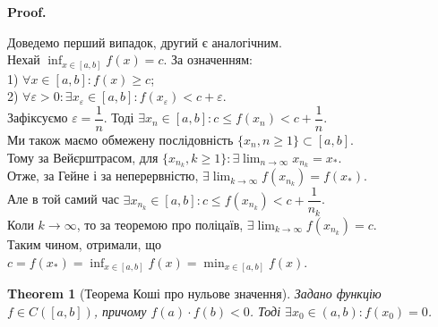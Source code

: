 \documentclass[a4paper, 14pt]{article}
\makeatletter
\def\huge{\displaystyle}
\def\qed{$\blacksquare$}
\theoremstyle{theoremdd}
\newtheorem{theorem}{Theorem}[subsection]
\theoremstyle{theoremdd}
\theoremstyle{theoremdd}
\theoremstyle{theoremdd}
\theoremstyle{theoremdd}
\theoremstyle{theoremdd}
\theoremstyle{theoremdd}
\theoremstyle{theoremdd}
\renewenvironment{proof}[1][Proof.\\]{\par
\pushQED{\hfill \qed}%
\normalfont \topsep6\p@\@plus6\p@\relax
\trivlist
\item\relax
{\bfseries
#1\@addpunct{.}}\hspace\labelsep\ignorespaces
}{%
\popQED\endtrivlist\@endpefalse
}
\makeatother
\begin{document}
\begin{proof}
Доведемо перший випадок, другий є аналогічним.\\
Нехай $\huge \inf_{x \in [a,b]} f(x) = c$. За означенням:\\
1) $\forall x \in [a,b]: f(x) \geq c$;\\
2) $\forall \varepsilon > 0: \exists x_{\varepsilon} \in [a,b]: f(x_{\varepsilon}) < c + \varepsilon$.\\
Зафіксуємо $\varepsilon = \dfrac{1}{n}$. Тоді $\exists x_n \in [a,b]: c \leq f(x_n) < c + \dfrac{1}{n}$.\\
Ми також маємо обмежену послідовність $\{x_n, n \geq 1\} \subset [a,b]$.\\
Тому за Вейєрштрасом, для $\{x_{n_k},k \geq 1\}: \exists \huge \lim_{n \to \infty} x_{n_k} = x_*$.\\
Отже, за Гейне і за неперервністю, $\huge \exists \lim_{k \to \infty} f(x_{n_k}) = f(x_*)$.\\
Але в той самий час $\exists x_{n_k} \in [a,b]: c \leq f(x_{n_k}) < c + \dfrac{1}{n_k}$.\\
Коли $k \to \infty$, то за теоремою про поліцаїв, $\exists \huge \lim_{k \to \infty} f(x_{n_k}) = c$.\\
Таким чином, отримали, що $c = f(x_*) = \huge \inf_{x \in [a,b]} f(x) = \min_{x \in [a,b]} f(x)$.
\end{proof}

\begin{theorem}[Теорема Коші про нульове значення]
Задано функцію $f \in C([a,b])$, причому $f(a) \cdot f(b) < 0$. Тоді $\exists x_0 \in (a,b): f(x_0) = 0$.
\end{theorem}
\end{document}
